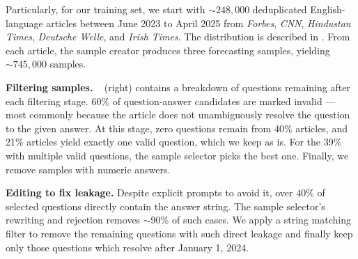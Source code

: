 \documentclass{article} %
\begin{document}
Particularly, for our training set, we start with $\sim248,000$ deduplicated English-language articles between June 2023 to April 2025 from \emph{Forbes}, \emph{CNN}, \emph{Hindustan Times}, \emph{Deutsche Welle}, and \emph{Irish Times}. The distribution is described in . From each article, the sample creator produces three forecasting samples, yielding $\sim745,000$ samples. \vspace{0.15cm}

\textbf{Filtering samples.} ~ (right) contains a breakdown of questions remaining after each filtering stage. 60\% of question-answer candidates are marked invalid --- most commonly because the article does not unambiguously resolve the question to the given answer. At this stage, zero questions remain from 40\% articles, and 21\% articles yield exactly one valid question, which we keep as is. For the 39\% with multiple valid questions, the sample selector picks the best one. Finally, we remove samples with numeric answers.\vspace{0.15cm}

 \textbf{Editing to fix leakage.} Despite explicit prompts to avoid it, over $40\%$ of selected questions directly contain the answer string. The sample selector's rewriting and rejection removes $\sim$90\% of such cases. We apply a string matching filter to remove the remaining questions with such direct leakage and finally keep only those questions which resolve after January 1, 2024. 
\end{document}
